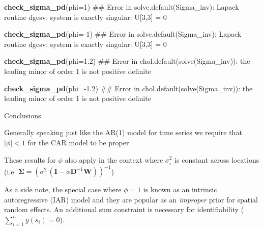 \documentclass[11pt,ignorenonframetext,]{beamer}
\newenvironment{Shaded}{}{}
\newcommand{\DataTypeTok}[1]{\textcolor[rgb]{0.56,0.13,0.00}{#1}}
\newcommand{\DecValTok}[1]{\textcolor[rgb]{0.25,0.63,0.44}{#1}}
\newcommand{\FloatTok}[1]{\textcolor[rgb]{0.25,0.63,0.44}{#1}}
\newcommand{\KeywordTok}[1]{\textcolor[rgb]{0.00,0.44,0.13}{\textbf{#1}}}
\newcommand{\NormalTok}[1]{#1}
\newcommand{\OperatorTok}[1]{\textcolor[rgb]{0.40,0.40,0.40}{#1}}
\let\oldShaded\Shaded
\let\endoldShaded\endShaded
\renewenvironment{Shaded}{\footnotesize\begin{spacing}{0.9}\oldShaded}{\endoldShaded\end{spacing}}
\begin{document}
\begin{frame}[fragile]{}
\protect\hypertarget{section-1}{}

\begin{Shaded}
\begin{Highlighting}[]
\KeywordTok{check_sigma_pd}\NormalTok{(}\DataTypeTok{phi=}\DecValTok{1}\NormalTok{)}
\NormalTok{## Error in solve.default(Sigma_inv): Lapack routine dgesv: system is exactly singular: U[3,3] = 0}

\KeywordTok{check_sigma_pd}\NormalTok{(}\DataTypeTok{phi=}\OperatorTok{-}\DecValTok{1}\NormalTok{)}
\NormalTok{## Error in solve.default(Sigma_inv): Lapack routine dgesv: system is exactly singular: U[3,3] = 0}

\KeywordTok{check_sigma_pd}\NormalTok{(}\DataTypeTok{phi=}\FloatTok{1.2}\NormalTok{)}
\NormalTok{## Error in chol.default(solve(Sigma_inv)): the leading minor of order 1 is not positive definite}

\KeywordTok{check_sigma_pd}\NormalTok{(}\DataTypeTok{phi=}\OperatorTok{-}\FloatTok{1.2}\NormalTok{)}
\NormalTok{## Error in chol.default(solve(Sigma_inv)): the leading minor of order 1 is not positive definite}
\end{Highlighting}
\end{Shaded}

\end{frame}

\begin{frame}[t]{Conclusions}
\protect\hypertarget{conclusions}{}

Generally speaking just like the AR(1) model for time series we require
that \(|\phi| < 1\) for the CAR model to be proper.

\vspace{4mm}

These results for \(\phi\) also apply in the context where
\(\sigma^2_i\) is constant across locations (i.e.
\(\symbf{\Sigma} = (\sigma^2 \, (\symbf{I}-\phi \symbf{D}^{-1}\symbf{W}))^{-1}\))

\vspace{8mm}

As a side note, the special case where \(\phi=1\) is known as an
intrinsic autoregressive (IAR) model and they are popular as an
\emph{improper} prior for spatial random effects. An additional sum
constraint is necessary for identifiability
(\(\sum_{i=1}^n y(s_i) = 0\)).

\end{frame}
\end{document}
